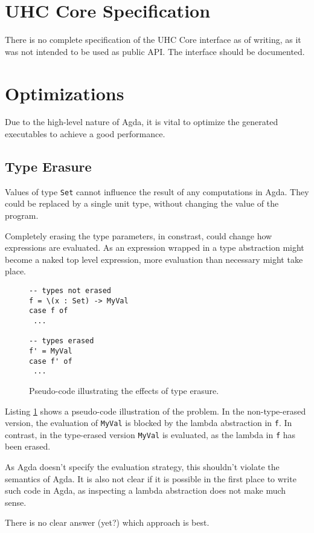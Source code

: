 \documentclass[12pt, a4paper, twoside]{report}
\begin{document}
\section{UHC Core Specification}
There is no complete specification of the UHC Core interface as of writing, as it was not
intended to be used as public API. The interface should be documented.

\section{Optimizations}
Due to the high-level nature of Agda, it is vital to optimize the generated
executables to achieve a good performance.

\subsection{Type Erasure}
Values of type \texttt{Set} cannot influence the result of any computations in Agda. They could be replaced
by a single unit type, without changing the value of the program.

Completely erasing the type parameters, in constrast, could change how expressions are evaluated.
As an expression wrapped in a type abstraction might become a naked top level
expression, more evaluation than necessary might take place.
\begin{figure}
\begin{lstlisting}
-- types not erased
f = \(x : Set) -> MyVal
case f of
 ... 

-- types erased
f' = MyVal
case f' of
 ...
\end{lstlisting}
\caption{Pseudo-code illustrating the effects of type erasure.}
\label{lst:pseu-ty-eras}
\end{figure}

Listing \ref{lst:pseu-ty-eras} shows a pseudo-code illustration of the problem.
In the non-type-erased version, the evaluation of \texttt{MyVal} is blocked by the lambda abstraction in \texttt{f}.
In contrast, in the type-erased version \texttt{MyVal} is evaluated, as the lambda in \texttt{f} has been erased.

As Agda doesn't specify the
evaluation strategy, this shouldn't violate the semantics of Agda. It is also not clear if
it is possible in the first place to write such code in Agda, as inspecting a lambda abstraction
does not make much sense.

There is no clear answer (yet?) which approach is best. %
\end{document}
